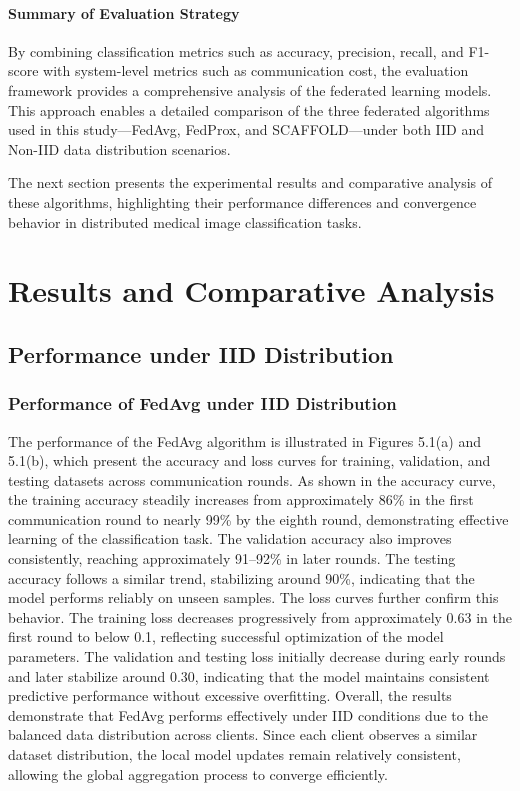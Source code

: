 \documentclass[12pt]{book}
\begin{document}
\subsubsection{Summary of Evaluation Strategy}

By combining classification metrics such as accuracy, precision, recall, and F1-score with system-level metrics such as communication cost, the evaluation framework provides a comprehensive analysis of the federated learning models. This approach enables a detailed comparison of the three federated algorithms used in this study—FedAvg, FedProx, and SCAFFOLD—under both IID and Non-IID data distribution scenarios.

The next section presents the experimental results and comparative analysis of these algorithms, highlighting their performance differences and convergence behavior in distributed medical image classification tasks.




\chapter{Results and Comparative Analysis}

\section{Performance under IID Distribution}


\subsection{Performance of FedAvg under IID Distribution}
The performance of the FedAvg algorithm is illustrated in Figures 5.1(a) and 5.1(b), which present the accuracy and loss curves for training, validation, and testing datasets across communication rounds.
As shown in the accuracy curve, the training accuracy steadily increases from approximately 86\% in the first communication round to nearly 99\% by the eighth round, demonstrating effective learning of the classification task. The validation accuracy also improves consistently, reaching approximately 91–92\% in later rounds.
The testing accuracy follows a similar trend, stabilizing around 90\%, indicating that the model performs reliably on unseen samples.
The loss curves further confirm this behavior. The training loss decreases progressively from approximately 0.63 in the first round to below 0.1, reflecting successful optimization of the model parameters. The validation and testing loss initially decrease during early rounds and later stabilize around 0.30, indicating that the model maintains consistent predictive performance without excessive overfitting.
Overall, the results demonstrate that FedAvg performs effectively under IID conditions due to the balanced data distribution across clients. Since each client observes a similar dataset distribution, the local model updates remain relatively consistent, allowing the global aggregation process to converge efficiently.
\end{document}
